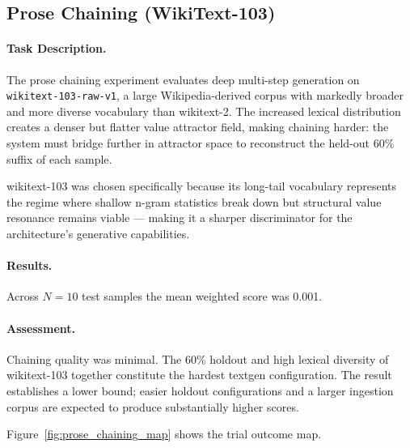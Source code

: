 \subsection{Prose Chaining (WikiText-103)}
\label{sec:prose_chaining}

\paragraph{Task Description.}
The prose chaining experiment evaluates deep multi-step generation on
\texttt{wikitext-103-raw-v1}, a large Wikipedia-derived corpus with markedly
broader and more diverse vocabulary than wikitext-2.  The increased lexical
distribution creates a denser but flatter value attractor field, making
chaining harder: the system must bridge further in attractor space to
reconstruct the held-out 60\% suffix of each sample.

wikitext-103 was chosen specifically because its long-tail vocabulary
represents the regime where shallow n-gram statistics break down but
structural value resonance remains viable --- making it a sharper
discriminator for the architecture's generative capabilities.

\paragraph{Results.}
Across $N = 10$ test samples the mean weighted score was 0.001.

\paragraph{Assessment.}
Chaining quality was minimal.  The 60\% holdout and high lexical diversity
of wikitext-103 together constitute the hardest textgen configuration.
The result establishes a lower bound; easier holdout configurations and
a larger ingestion corpus are expected to produce substantially higher scores.

Figure~\ref{fig:prose_chaining_map} shows the trial outcome map.

